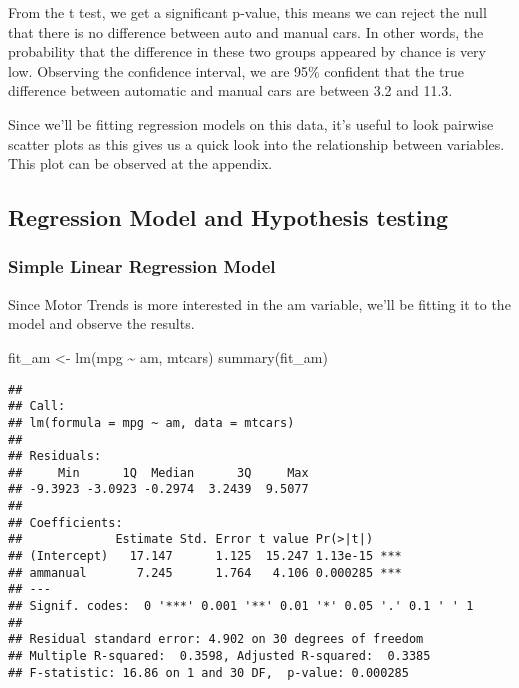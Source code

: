 \documentclass[
]{article}
\newenvironment{Shaded}{\begin{snugshade}}{\end{snugshade}}
\newcommand{\FunctionTok}[1]{\textcolor[rgb]{0.00,0.00,0.00}{#1}}
\newcommand{\NormalTok}[1]{#1}
\newcommand{\OtherTok}[1]{\textcolor[rgb]{0.56,0.35,0.01}{#1}}
\newcommand{\SpecialCharTok}[1]{\textcolor[rgb]{0.00,0.00,0.00}{#1}}
\begin{document}
From the t test, we get a significant p-value, this means we can reject
the null that there is no difference between auto and manual cars. In
other words, the probability that the difference in these two groups
appeared by chance is very low. Observing the confidence interval, we
are 95\% confident that the true difference between automatic and manual
cars are between 3.2 and 11.3.

Since we'll be fitting regression models on this data, it's useful to
look pairwise scatter plots as this gives us a quick look into the
relationship between variables. This plot can be observed at the
appendix.

\hypertarget{regression-model-and-hypothesis-testing}{%
\subsection{Regression Model and Hypothesis
testing}\label{regression-model-and-hypothesis-testing}}

\hypertarget{simple-linear-regression-model}{%
\subsubsection{Simple Linear Regression
Model}\label{simple-linear-regression-model}}

Since Motor Trends is more interested in the am variable, we'll be
fitting it to the model and observe the results.

\begin{Shaded}
\begin{Highlighting}[]
\NormalTok{fit\_am }\OtherTok{\textless{}{-}} \FunctionTok{lm}\NormalTok{(mpg }\SpecialCharTok{\textasciitilde{}}\NormalTok{ am, mtcars)}
\FunctionTok{summary}\NormalTok{(fit\_am) }
\end{Highlighting}
\end{Shaded}

\begin{verbatim}
## 
## Call:
## lm(formula = mpg ~ am, data = mtcars)
## 
## Residuals:
##     Min      1Q  Median      3Q     Max 
## -9.3923 -3.0923 -0.2974  3.2439  9.5077 
## 
## Coefficients:
##             Estimate Std. Error t value Pr(>|t|)    
## (Intercept)   17.147      1.125  15.247 1.13e-15 ***
## ammanual       7.245      1.764   4.106 0.000285 ***
## ---
## Signif. codes:  0 '***' 0.001 '**' 0.01 '*' 0.05 '.' 0.1 ' ' 1
## 
## Residual standard error: 4.902 on 30 degrees of freedom
## Multiple R-squared:  0.3598, Adjusted R-squared:  0.3385 
## F-statistic: 16.86 on 1 and 30 DF,  p-value: 0.000285
\end{verbatim}
\end{document}
